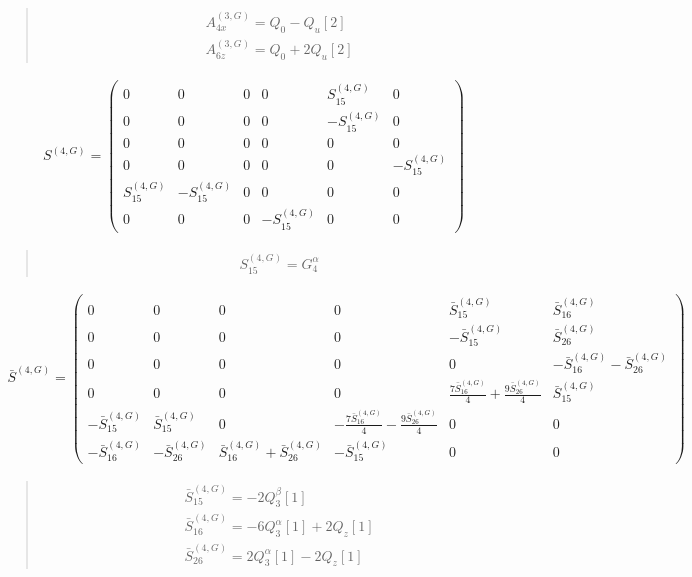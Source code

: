 \documentclass[fleqn,10pt]{jsarticle}
\begin{document}
\begin{quote}
\begin{align*}
& A^{(3,G)}_{4x} = Q_{0} - Q_{u}[2] \\
& A^{(3,G)}_{6z} = Q_{0} + 2 Q_{u}[2]
\end{align*}
\end{quote}
\begin{align*}
S^{(4,G)} = \begin{pmatrix} 0 & 0 & 0 & 0 & S^{(4,G)}_{15} & 0 \\ 0 & 0 & 0 & 0 & - S^{(4,G)}_{15} & 0 \\ 0 & 0 & 0 & 0 & 0 & 0 \\ 0 & 0 & 0 & 0 & 0 & - S^{(4,G)}_{15} \\ S^{(4,G)}_{15} & - S^{(4,G)}_{15} & 0 & 0 & 0 & 0 \\ 0 & 0 & 0 & - S^{(4,G)}_{15} & 0 & 0 \end{pmatrix}
\end{align*}
\begin{quote}
\begin{align*}
& S^{(4,G)}_{15} = G_{4}^{\alpha}
\end{align*}
\end{quote}
\begin{align*}
\bar{S}^{(4,G)} = \begin{pmatrix} 0 & 0 & 0 & 0 & \bar{S}^{(4,G)}_{15} & \bar{S}^{(4,G)}_{16} \\ 0 & 0 & 0 & 0 & - \bar{S}^{(4,G)}_{15} & \bar{S}^{(4,G)}_{26} \\ 0 & 0 & 0 & 0 & 0 & - \bar{S}^{(4,G)}_{16} - \bar{S}^{(4,G)}_{26} \\ 0 & 0 & 0 & 0 & \frac{7 \bar{S}^{(4,G)}_{16}}{4} + \frac{9 \bar{S}^{(4,G)}_{26}}{4} & \bar{S}^{(4,G)}_{15} \\ - \bar{S}^{(4,G)}_{15} & \bar{S}^{(4,G)}_{15} & 0 & - \frac{7 \bar{S}^{(4,G)}_{16}}{4} - \frac{9 \bar{S}^{(4,G)}_{26}}{4} & 0 & 0 \\ - \bar{S}^{(4,G)}_{16} & - \bar{S}^{(4,G)}_{26} & \bar{S}^{(4,G)}_{16} + \bar{S}^{(4,G)}_{26} & - \bar{S}^{(4,G)}_{15} & 0 & 0 \end{pmatrix}
\end{align*}
\begin{quote}
\begin{align*}
& \bar{S}^{(4,G)}_{15} = - 2 Q_{3}^{\beta}[1] \\
& \bar{S}^{(4,G)}_{16} = - 6 Q_{3}^{\alpha}[1] + 2 Q_{z}[1] \\
& \bar{S}^{(4,G)}_{26} = 2 Q_{3}^{\alpha}[1] - 2 Q_{z}[1]
\end{align*}
\end{quote}
\end{document}
